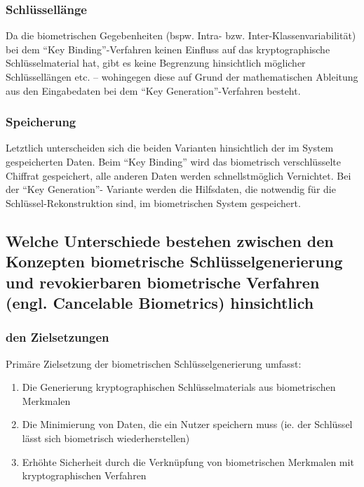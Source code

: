 \documentclass{article}
\begin{document}
\subsubsection*{Schlüssellänge}

Da die biometrischen Gegebenheiten (bspw. Intra- bzw. Inter-Klassenvariabilität) bei dem ``Key Binding''-Verfahren keinen Einfluss
auf das kryptographische Schlüsselmaterial hat, gibt es keine Begrenzung hinsichtlich möglicher Schlüssellängen etc. – wohingegen diese
auf Grund der mathematischen Ableitung aus den Eingabedaten bei dem ``Key Generation''-Verfahren besteht.

\subsubsection*{Speicherung}

Letztlich unterscheiden sich die beiden Varianten hinsichtlich der im System gespeicherten Daten. Beim ``Key Binding'' wird das
biometrisch verschlüsselte Chiffrat gespeichert, alle anderen Daten werden schnellstmöglich Vernichtet. Bei der ``Key Generation''-
Variante werden die Hilfsdaten, die notwendig für die Schlüssel-Rekonstruktion sind, im biometrischen System gespeichert.

\subsection{Welche Unterschiede bestehen zwischen den Konzepten biometrische Schlüsselgenerierung und
revokierbaren biometrische Verfahren (engl. Cancelable Biometrics) hinsichtlich}

\subsubsection{den Zielsetzungen}

Primäre Zielsetzung der biometrischen Schlüsselgenerierung umfasst:

\begin{enumerate}
	\item Die Generierung kryptographischen Schlüsselmaterials aus biometrischen Merkmalen
	\item Die Minimierung von Daten, die ein Nutzer speichern muss (ie. der Schlüssel lässt sich biometrisch wiederherstellen)
	\item Erhöhte Sicherheit durch die Verknüpfung von biometrischen Merkmalen mit kryptographischen Verfahren
\end{enumerate}
\end{document}

